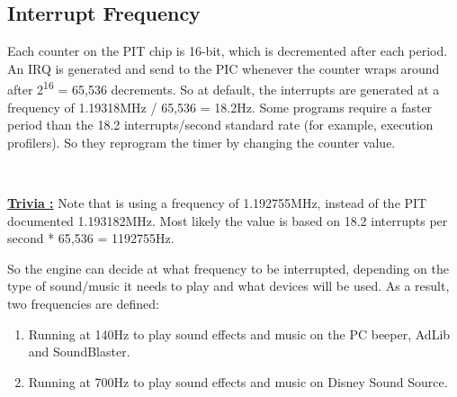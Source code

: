 \documentclass[book.tex]{subfiles}
\begin{document}
\subsection{Interrupt Frequency}
Each counter on the PIT chip is 16-bit, which is decremented after each period. An IRQ is generated and send to the PIC whenever the counter wraps around after 2\textsuperscript{16} = 65,536 decrements. So at default, the interrupts are generated at a frequency of 1.19318MHz / 65,536 = 18.2Hz. Some programs require a faster period than the 18.2 interrupts/second standard rate (for example, execution profilers). So they reprogram the timer by changing the counter value.\\
\par
\begin{minipage}{\textwidth}

\end{minipage}\\
\par

\textbf{\underline{Trivia :}} Note that  is using a frequency of 1.192755MHz, instead of the PIT documented 1.193182MHz. Most likely the value is based on 18.2 interrupts per second * 65,536 = 1192755Hz.\\

\par
So the engine can decide at what frequency to be interrupted, depending on the type of sound/music it needs to play and what devices will be used. As a result, two frequencies are defined: 
\begin{enumerate}
\item Running at 140Hz to play sound effects and music on the PC beeper, AdLib and SoundBlaster.
\item Running at 700Hz to play sound effects and music on Disney Sound Source.
\end{enumerate}
\par
\begin{minipage}{\textwidth}

\end{minipage}
\par
\end{document}
